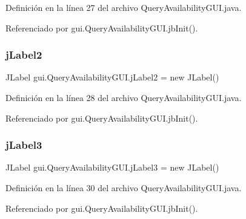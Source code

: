 Definición en la línea 27 del archivo Query\+Availability\+G\+U\+I.\+java.



Referenciado por gui.\+Query\+Availability\+G\+U\+I.\+jb\+Init().

\mbox{\label{classgui_1_1_query_availability_g_u_i_af08ae2b6de897ece4fc97bca2985be79}} 
\subsubsection{\texorpdfstring{jLabel2}{jLabel2}}
{\footnotesize\ttfamily J\+Label gui.\+Query\+Availability\+G\+U\+I.\+j\+Label2 = new J\+Label()\hspace{0.3cm}{\ttfamily [private]}}



Definición en la línea 28 del archivo Query\+Availability\+G\+U\+I.\+java.



Referenciado por gui.\+Query\+Availability\+G\+U\+I.\+jb\+Init().

\mbox{\label{classgui_1_1_query_availability_g_u_i_ad0e46911f17f831ea3b90dd9c789cd69}} 
\subsubsection{\texorpdfstring{jLabel3}{jLabel3}}
{\footnotesize\ttfamily J\+Label gui.\+Query\+Availability\+G\+U\+I.\+j\+Label3 = new J\+Label()\hspace{0.3cm}{\ttfamily [private]}}



Definición en la línea 30 del archivo Query\+Availability\+G\+U\+I.\+java.



Referenciado por gui.\+Query\+Availability\+G\+U\+I.\+jb\+Init().

\mbox{\label{classgui_1_1_query_availability_g_u_i_a95ee33d80af86f083141251d710c8aa3}} 
